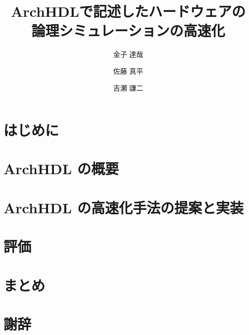 \documentclass[submit,techreq,noauthor,papersize,]{ipsj}
\title{ArchHDLで記述したハードウェアの\\ 論理シミュレーションの高速化}
\author{金子 達哉}{Kaneko Tatsuya}{TOKYOTECH_B}[kaneko@arch.cs.titech.ac.jp]
\author{佐藤 真平}{Sato Shimpei}{TOKYOTECH}[satos@arch.cs.titech.ac.jp]
\author{吉瀬 謙二}{Kise Kenji}{TOKYOTECH}[kise@cs.titech.ac.jp]
\author{}
\date{}
\begin{document}
\begin{abstract}
 
\end{abstract}

\maketitle

\section{はじめに}



\section{ArchHDL の概要}

\label{s:summary}



\section{ArchHDL の高速化手法の提案と実装}

\label{s:method}



\section{評価}

\label{s:evaluation}



\section{まとめ}

\label{s:conclusion}



\section*{謝辞}

\label{s:acknowledgment}




\end{document}
